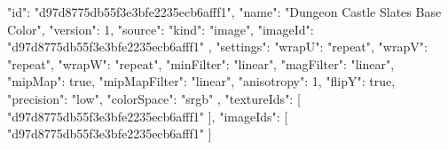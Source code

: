 {
  "id": "d97d8775db55f3e3bfe2235ecb6afff1",
  "name": "Dungeon Castle Slates Base Color",
  "version": 1,
  "source": {
    "kind": "image",
    "imageId": "d97d8775db55f3e3bfe2235ecb6afff1"
  },
  "settings": {
    "wrapU": "repeat",
    "wrapV": "repeat",
    "wrapW": "repeat",
    "minFilter": "linear",
    "magFilter": "linear",
    "mipMap": true,
    "mipMapFilter": "linear",
    "anisotropy": 1,
    "flipY": true,
    "precision": "low",
    "colorSpace": "srgb"
  },
  "textureIds": [
    "d97d8775db55f3e3bfe2235ecb6afff1"
  ],
  "imageIds": [
    "d97d8775db55f3e3bfe2235ecb6afff1"
  ]
}
